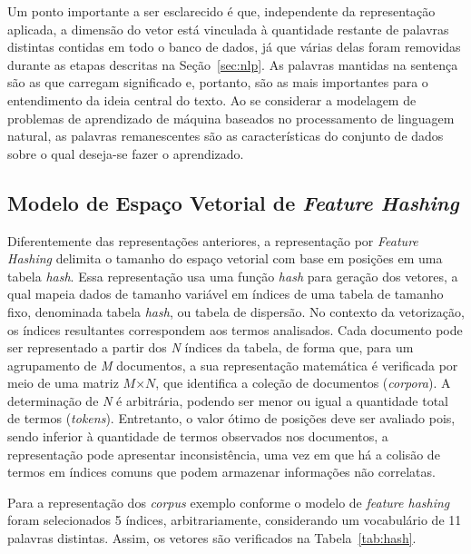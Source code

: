 \documentclass{SBCbookchapter}
\begin{document}
Um ponto importante a ser esclarecido é que, independente da representação aplicada, a dimensão do vetor está vinculada à quantidade restante de palavras distintas contidas em todo o banco de dados, já que várias delas foram removidas durante as etapas descritas na Seção~\ref{sec:nlp}. As palavras mantidas na sentença são as que carregam significado e, portanto, são as mais importantes para o entendimento da ideia central do texto. Ao se considerar a modelagem de problemas de aprendizado de máquina baseados no processamento de linguagem natural, as palavras remanescentes são as características do conjunto de dados sobre o qual deseja-se fazer o aprendizado.

\subsection{Modelo de Espaço Vetorial de \textit{Feature Hashing}}

Diferentemente das representações anteriores, a representação por \textit{Feature Hashing} delimita o tamanho do espaço vetorial com base em posições em uma tabela \textit{hash}. Essa representação usa uma função \textit{hash} para geração dos vetores, a qual mapeia dados de tamanho variável em índices de uma tabela de tamanho fixo, denominada tabela \textsl{hash}, ou tabela de dispersão. No contexto da vetorização, os índices resultantes correspondem aos termos analisados.
%
Cada documento pode ser representado a partir dos \textsl{N} índices da tabela, de forma que, para um agrupamento de \textsl{M} documentos, a sua representação matemática é verificada por meio de uma matriz $M$$\times$$N$, que identifica a coleção de documentos (\textit{corpora}). A determinação de \textsl{N} é arbitrária, podendo ser menor ou igual a quantidade total de termos (\textit{tokens}). Entretanto, o valor ótimo de posições deve ser avaliado pois, sendo inferior à quantidade de termos observados nos documentos, a representação pode apresentar inconsistência, uma vez em que há a colisão de termos em índices comuns que podem armazenar informações não correlatas.

Para a representação dos \textit{corpus} exemplo conforme o modelo de \textit{feature hashing} foram selecionados 5 índices, arbitrariamente, considerando um vocabulário de 11 palavras distintas. Assim, os vetores são verificados na Tabela~\ref{tab:hash}.
\end{document}
